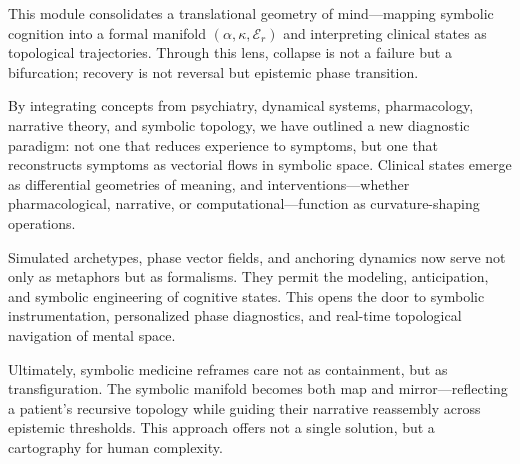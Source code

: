 This module consolidates a translational geometry of mind—mapping symbolic cognition into a formal manifold $(\alpha, \kappa, \mathcal{E}_r)$ and interpreting clinical states as topological trajectories. Through this lens, collapse is not a failure but a bifurcation; recovery is not reversal but epistemic phase transition.

By integrating concepts from psychiatry, dynamical systems, pharmacology, narrative theory, and symbolic topology, we have outlined a new diagnostic paradigm: not one that reduces experience to symptoms, but one that reconstructs symptoms as vectorial flows in symbolic space. Clinical states emerge as differential geometries of meaning, and interventions—whether pharmacological, narrative, or computational—function as curvature-shaping operations.

Simulated archetypes, phase vector fields, and anchoring dynamics now serve not only as metaphors but as formalisms. They permit the modeling, anticipation, and symbolic engineering of cognitive states. This opens the door to symbolic instrumentation, personalized phase diagnostics, and real-time topological navigation of mental space.

Ultimately, symbolic medicine reframes care not as containment, but as transfiguration. The symbolic manifold becomes both map and mirror—reflecting a patient’s recursive topology while guiding their narrative reassembly across epistemic thresholds. This approach offers not a single solution, but a cartography for human complexity.
